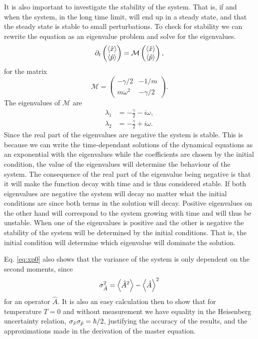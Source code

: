 It is also important to investigate the stability of the system. That is, if and when the system, in the long time limit, will end up in a steady state, and that the steady state is stable to small perturbations. To check for stability we can rewrite the equation as an eigenvalue problem and solve for the eigenvalues.
\begin{equation}
    \partial_t 
    \begin{pmatrix}
        \expval{\hat{x}}\\
        \expval{\hat{p}}    
    \end{pmatrix}
    = \mathcal{M}
    \begin{pmatrix}
        \expval{\hat{x}}\\
        \expval{\hat{p}} 
    \end{pmatrix},
\end{equation}
for the matrix
\begin{equation}
    \mathcal{M} = \begin{pmatrix}
        -\gamma/2 & -1/m \\
        m\omega^2 & -\gamma/2
    \end{pmatrix}.
\end{equation}
The eigenvalues of $\mathcal{M}$ are 
\begin{align}
    \lambda_1 &= -\frac{\gamma}{2} - i\omega,\\
    \lambda_2 &= -\frac{\gamma}{2} + i\omega.
\end{align}
Since the real part of the eigenvalues are negative the system is stable. This is because we can write the time-dependant solutions of the dynamical equations as an exponential with the eigenvalues while the coefficients are chosen by the initial condition, the value of the eigenvalues will determine the behaviour of the system. The consequence of the real part of the eigenvalue being negative is that it will make the function decay with time and is thus considered stable. If both eigenvalues are negative the system will decay no matter what the initial conditions are since both terms in the solution will decay. Positive eigenvalues on the other hand will correspond to the system growing with time and will thus be unstable. When one of the eigenvalues is positive and the other is negative the stability of the system will be determined by the initial conditions. That is, the initial condition will determine which eigenvalue will dominate the solution.

Eq. \eqref{eq:xp0} also shows that the variance of the system is only dependent on the second moments, since
\begin{equation}
    \sigma^2_{\hat{A}} = \expval{\hat{A}^2} - \expval{\hat{A}}^2
\end{equation}
for an operator $\hat{A}$. It is also an easy calculation then to show that for temperature $T=0$ and without measurement we have equality in the Heisenberg uncertainty relation, $\sigma_{\hat{x}} \sigma_{\hat{p}} = \hbar/2$, justifying the accuracy of the results, and the approximations made in the derivation of the master equation.

